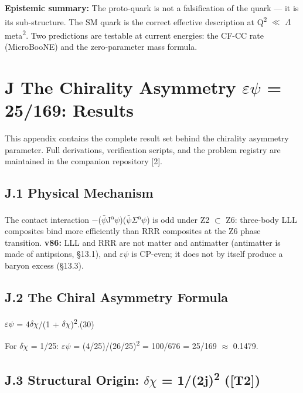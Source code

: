 \documentclass[11pt,letterpaper]{article}
\begin{document}
\noindent \textbf{Epistemic summary: }The proto-quark is not a falsification of the quark --- it is its sub-structure. The SM quark is the correct effective description at Q\textsuperscript{2} $\ll$ $\Lambda$meta\textsuperscript{2}. Two predictions are testable at current energies: the CF-CC rate (MicroBooNE) and the zero-parameter mass formula.

\clearpage
\section*{J  The Chirality Asymmetry $\varepsilon$$\psi$ = 25/169: Results}

\noindent This appendix contains the complete result set behind the chirality asymmetry parameter. Full derivations, verification scripts, and the problem registry are maintained in the companion repository [2].

\subsection*{J.1  Physical Mechanism}

\noindent The contact interaction $-$($\bar{\psi}$J\textsuperscript{a}$\psi$)($\bar{\psi}$$\Sigma$\textsuperscript{a}$\psi$) is odd under Z2 $\subset$ Z6: three-body LLL composites bind more efficiently than RRR composites at the Z6 phase transition. \textbf{v86:} LLL and RRR are not matter and antimatter (antimatter is made of antipsions, §13.1), and $\varepsilon$$\psi$ is CP-even; it does not by itself produce a baryon excess (§13.3).

\subsection*{J.2  The Chiral Asymmetry Formula}

\begingroup\centering $\varepsilon$$\psi$ = 4$\delta$$\chi$/(1 + $\delta$$\chi$)\textsuperscript{2}.\hspace{2em}(30)\par\endgroup

\noindent For $\delta$$\chi$ = 1/25: $\varepsilon$$\psi$ = (4/25)/(26/25)\textsuperscript{2} = 100/676 = 25/169 $\approx$ 0.1479.

\subsection*{J.3  Structural Origin: $\delta$$\chi$ = 1/(2j)\textsuperscript{2} ([T2])}
\end{document}
